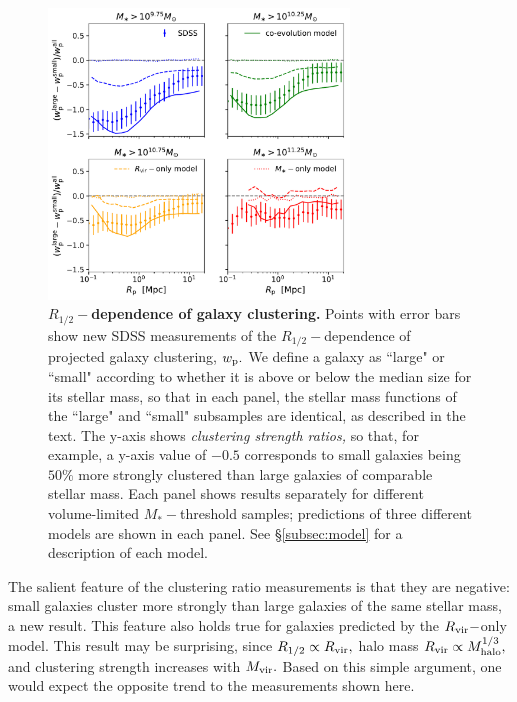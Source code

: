 \documentclass[usenatbib,usegraphicx,letterpaper]{mn2e}
\newcommand{\rhalf}{R_{1/2}}
\newcommand{\mstar}{M_{\ast}}
\newcommand{\mvir}{M_{\rm vir}}
\newcommand{\mhalo}{M_{\rm halo}}
\newcommand{\rvir}{R_{\rm vir}}
\newcommand{\wproj}{w_{\rm p}}
\begin{document}
\begin{figure}
\centering
\includegraphics[width=8cm]{FIGS/penultimate_clustering_ratios_no_orphans.pdf}
\caption{
{\bf $\rhalf-$dependence of galaxy clustering.}
Points with error bars show new SDSS measurements of the $\rhalf-$dependence of projected galaxy clustering, $\wproj.$ We define a galaxy as ``large" or ``small" according to whether it is above or below the median size for its stellar mass, so that in each panel, the stellar mass functions of the ``large" and ``small" subsamples are identical, as described in the text. The y-axis shows {\em clustering strength ratios,} so that, for example, a y-axis value of $-0.5$ corresponds to small galaxies being $50\%$ more strongly clustered than large galaxies of comparable stellar mass. Each panel shows results separately for different volume-limited $\mstar-$threshold samples; predictions of three different models are shown in each panel. See \S\ref{subsec:model} for a description of each model.}
\label{fig:clustering_ratio_upshot}
\end{figure}

The salient feature of the clustering ratio measurements is that they are negative: small galaxies cluster more strongly than large galaxies of the same stellar mass, a new result. This feature also holds true for galaxies predicted by the $\rvir-$only model. This result may be surprising, since $\rhalf\propto\rvir,$ halo mass $\rvir\propto\mhalo^{1/3},$ and clustering strength increases with $\mvir.$ Based on this simple argument, one would expect the opposite trend to the measurements shown here.
\end{document}

